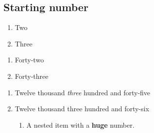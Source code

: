 \subsection{\label{starting-number}Starting number}
\begin{enumerate}
\item
\par Two \item
\par Three
\end{enumerate}
\begin{enumerate}
\item
\par Forty-two \item
\par Forty-three
\end{enumerate}
\begin{enumerate}
\item
\par Twelve thousand \emph{three} hundred and forty-five \item
\par Twelve thousand three hundred and forty-six
\begin{enumerate}
\item
\par A nested item with a \textbf{huge} number.
\end{enumerate}
\end{enumerate}
